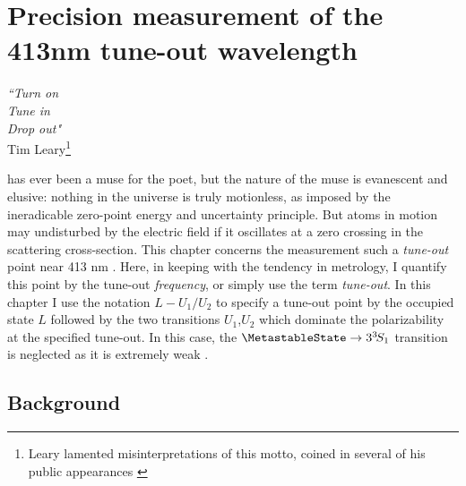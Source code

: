 \newcommand{\fto}{f_\mathrm{TO}}

\chapter{Precision measurement of the 413nm tune-out wavelength}
\label{chap:tuneout}


	\begin{flushright}
	{\emph{``Turn on\\
			Tune in\\
			Drop out"\\} 
	Tim Leary\footnote{Leary lamented misinterpretations of this motto, coined in several of his public appearances \cite{LearyNote}}}
	\end{flushright}

	 has ever been a muse for the poet, but the nature of the muse is evanescent and elusive: nothing in the universe is truly motionless, as imposed by the ineradicable zero-point energy and uncertainty principle.
	But atoms in motion may undisturbed by the electric field if it oscillates at a zero crossing in the scattering cross-section.
	This chapter concerns the measurement such a \emph{tune-out} point near 413 nm \cite{Henson13,Mitroy13}.
	Here, in keeping with the tendency in metrology, I quantify this point by the tune-out \emph{frequency}, or simply use the term \emph{tune-out}. In this chapter I use the notation $L-U_1/U_2$ to specify a tune-out point by the occupied state $L$ followed by the two transitions $U_1$,$U_2$ which dominate the polarizability at the specified tune-out. In this case, the $\MetastableState \rightarrow 3^{3\!}S_1 $ transition is neglected as it is extremely weak \cite{Thomas20}. 


	
\section{Background}

